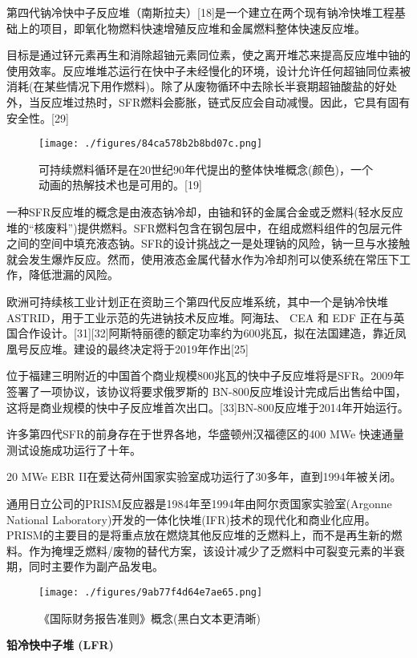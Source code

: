 第四代钠冷快中子反应堆（南斯拉夫）[18]是一个建立在两个现有钠冷快堆工程基础上的项目，即氧化物燃料快速增殖反应堆和金属燃料整体快速反应堆。

目标是通过钚元素再生和消除超铀元素同位素，使之离开堆芯来提高反应堆中铀的使用效率。反应堆堆芯运行在快中子未经慢化的环境，设计允许任何超铀同位素被消耗(在某些情况下用作燃料)。除了从废物循环中去除长半衰期超铀酸盐的好处外，当反应堆过热时，SFR燃料会膨胀，链式反应会自动减慢。因此，它具有固有安全性。[29]

\begin{figure}[ht]
\centering
\texttt{[image: ./figures/84ca578b2b8bd07c.png]}
\caption{可持续燃料循环是在20世纪90年代提出的整体快堆概念(颜色)，一个动画的热解技术也是可用的。[19]} \label{fig_FYD_5}
\end{figure}
一种SFR反应堆的概念是由液态钠冷却，由铀和钚的金属合金或乏燃料(轻水反应堆的“核废料”)提供燃料。SFR燃料包含在钢包层中，在组成燃料组件的包层元件之间的空间中填充液态钠。SFR的设计挑战之一是处理钠的风险，钠一旦与水接触就会发生爆炸反应。然而，使用液态金属代替水作为冷却剂可以使系统在常压下工作，降低泄漏的风险。

欧洲可持续核工业计划正在资助三个第四代反应堆系统，其中一个是钠冷快堆ASTRID，用于工业示范的先进钠技术反应堆。阿海珐、 CEA 和 EDF 正在与英国合作设计。[31][32]阿斯特丽德的额定功率约为600兆瓦，拟在法国建造，靠近凤凰号反应堆。建设的最终决定将于2019年作出[25]

位于福建三明附近的中国首个商业规模800兆瓦的快中子反应堆将是SFR。2009年签署了一项协议，该协议将要求俄罗斯的 BN-800反应堆设计完成后出售给中国，这将是商业规模的快中子反应堆首次出口。[33]BN-800反应堆于2014年开始运行。

许多第四代SFR的前身存在于世界各地，华盛顿州汉福德区的400 MWe 快速通量测试设施成功运行了十年。

20 MWe EBR II在爱达荷州国家实验室成功运行了30多年，直到1994年被关闭。

通用日立公司的PRISM反应器是1984年至1994年由阿尔贡国家实验室(Argonne National Laboratory)开发的一体化快堆(IFR)技术的现代化和商业化应用。PRISM的主要目的是将重点放在燃烧其他反应堆的乏燃料上，而不是再生新的燃料。作为掩埋乏燃料/废物的替代方案，该设计减少了乏燃料中可裂变元素的半衰期，同时主要作为副产品发电。
\begin{figure}[ht]
\centering
\texttt{[image: ./figures/9ab77f4d64e7ae65.png]}
\caption{《国际财务报告准则》概念(黑白文本更清晰)} \label{fig_FYD_6}
\end{figure}

\textbf{铅冷快中子堆 (LFR)}

